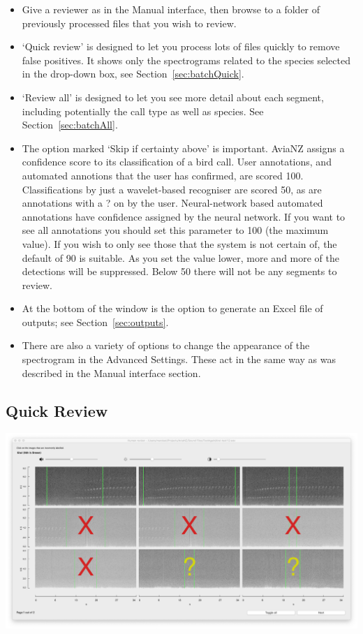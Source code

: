 \documentclass{article}
\begin{document}
\begin{itemize}
\item Give a reviewer as in the Manual interface, then browse to a folder of previously processed files that you wish to review.
\item `Quick review' is designed to let you process lots of files quickly to remove false positives. It shows only the spectrograms related to the species selected in the drop-down box, see Section~\ref{sec:batchQuick}.
\item `Review all' is designed to let you see more detail about each segment, including potentially the call type as well as species. See Section~\ref{sec:batchAll}.
\item The option marked `Skip if certainty above' is important. AviaNZ assigns a confidence score to its classification of a bird call. User annotations, and automated annotions that the user has confirmed, are scored 100. Classifications by just a wavelet-based recogniser are scored 50, as are annotations with a ? on by the user. Neural-network based automated annotations have confidence assigned by the neural network. If you want to see all annotations you should set this parameter to 100 (the maximum value). If you wish to only see those that the system is not certain of, the default of 90 is suitable. As you set the value lower, more and more of the detections will be suppressed. Below 50 there will not be any segments to review.
\item At the bottom of the window is the option to generate an Excel file of outputs; see Section~\ref{sec:outputs}.
\item There are also a variety of options to change the appearance of the spectrogram in the Advanced Settings. These act in the same way as was described in the Manual interface section.
\end{itemize}

\subsection{Quick Review\label{sec:batchQuick}}

\begin{center}
	\includegraphics[width=.9\textwidth]{Figures/BatchReview2}
\end{center}
\end{document}
